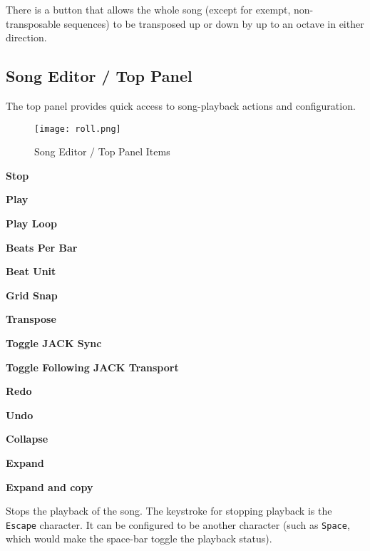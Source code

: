    There is a button that allows the whole song (except for
   exempt, non-transposable sequences) to be transposed up or down by up to an
   octave in either direction.

\subsection{Song Editor / Top Panel}
\label{subsec:seq66_song_editor_top}

   The top panel provides quick access to song-playback actions and
   configuration.

\begin{figure}[H]
   \centering 
   \texttt{[image: roll.png]}
   \caption{Song Editor / Top Panel Items}
   \label{fig:song_editor_top_panel_items}
\end{figure}

   \begin{enumber}
      \item \textbf{Stop}
      \item \textbf{Play}
      \item \textbf{Play Loop}
      \item \textbf{Beats Per Bar}
      \item \textbf{Beat Unit}
      \item \textbf{Grid Snap}
      \item \textbf{Transpose}
      \item \textbf{Toggle JACK Sync}
      \item \textbf{Toggle Following JACK Transport}
      \item \textbf{Redo}
      \item \textbf{Undo}
      \item \textbf{Collapse}
      \item \textbf{Expand}
      \item \textbf{Expand and copy}
   \end{enumber}

   \setcounter{ItemCounter}{0}      %

   Stops the playback of the song.
   The keystroke for stopping playback is the \texttt{Escape} character.
   It can be configured to be another character (such as \texttt{Space}, which
   would make the space-bar toggle the playback status).

